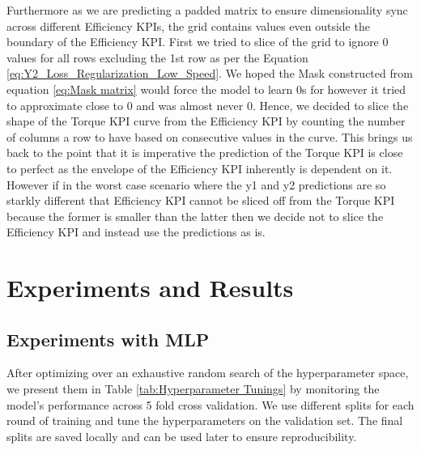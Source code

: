 \documentclass{report} %
\begin{document}
Furthermore as we are predicting a padded matrix to ensure dimensionality sync across different Efficiency \ac{KPI}s, the grid contains values even outside the boundary of the Efficiency \ac{KPI}.
First we tried to slice of the grid to ignore 0 values for all rows excluding the 1st row as per the Equation \ref{eq:Y2_Loss_Regularization_Low_Speed}.
We hoped the Mask constructed from equation \ref{eq:Mask matrix} would force the model to learn 0s for however it tried to approximate close to 0 and was almost never 0.
Hence, we decided to slice the shape of the Torque \ac{KPI} curve from the Efficiency \ac{KPI} by counting the number of columns a row to have based on consecutive values in the curve.
This brings us back to the point that it is imperative the prediction of the Torque \ac{KPI} is close to perfect as the envelope of the Efficiency \ac{KPI} inherently is dependent on it.
However if in the worst case scenario where the y1 and y2 predictions are so starkly different that Efficiency \ac{KPI} cannot be sliced off from 
the Torque \ac{KPI} because the former is smaller than the latter then we decide not to slice the Efficiency \ac{KPI} and instead use the predictions as is.

\newpage 

\chapter{Experiments and Results}

\section{Experiments with \ac{MLP}}\label{sec:Experiments with MLP}

After optimizing over an exhaustive random search of the hyperparameter space, we present them in Table \ref{tab:Hyperparameter Tunings} by monitoring the model's 
performance across 5 fold cross validation. We use different splits for each round of training and tune the hyperparameters on the validation set. 
The final splits are saved locally and can be used later to ensure reproducibility. 
\end{document}
